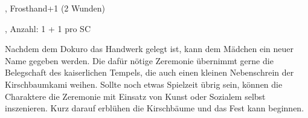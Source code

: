 {			, Frosthand+1 (2 Wunden)

			, Anzahl: 1 + 1 pro SC


		\noindent
		Nachdem dem Dokuro das Handwerk gelegt ist, kann dem Mädchen ein neuer Name gegeben werden. Die dafür nötige Zeremonie übernimmt gerne die Belegschaft des kaiserlichen Tempels, die auch einen kleinen Nebenschrein der Kirschbaumkami weihen. Sollte noch etwas Spielzeit übrig sein, können die Charaktere die Zeremonie mit Einsatz von Kunst oder Sozialem selbst inszenieren. Kurz darauf erblühen die Kirschbäume und das Fest kann beginnen.
}
